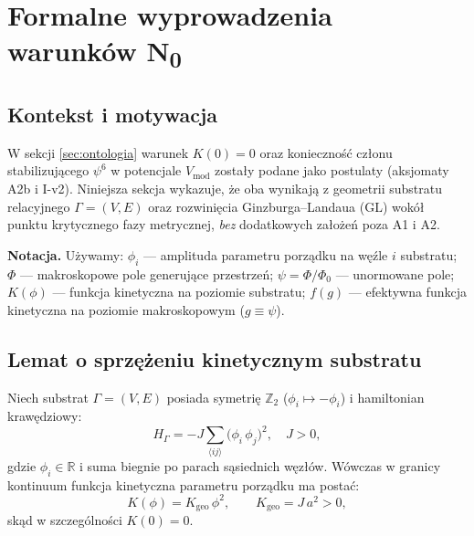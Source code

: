 %
%

\section{Formalne wyprowadzenia warunków N\textsubscript{0}}
\label{sec:N0_derivation}

\subsection{Kontekst i motywacja}

W sekcji \ref{sec:ontologia} warunek $K(0) = 0$ oraz konieczność członu
stabilizującego $\psi^6$ w potencjale $V_\mathrm{mod}$ zostały podane jako
postulaty (aksjomaty A2b i I-v2). Niniejsza sekcja wykazuje, że oba wynikają
z geometrii substratu relacyjnego $\Gamma = (V,E)$ oraz rozwinięcia
Ginzburga–Landaua (GL) wokół punktu krytycznego fazy metrycznej,
\emph{bez} dodatkowych założeń poza A1 i A2.

\medskip
\noindent\textbf{Notacja.} Używamy: $\phi_i$ — amplituda parametru porządku
na węźle $i$ substratu; $\Phi$ — makroskopowe pole generujące przestrzeń;
$\psi = \Phi/\Phi_0$ — unormowane pole; $K(\phi)$ — funkcja kinetyczna
na poziomie substratu; $f(g)$ — efektywna funkcja kinetyczna na poziomie
makroskopowym ($g \equiv \psi$).

\subsection{Lemat o sprzężeniu kinetycznym substratu}
\label{subsec:substrate_coupling}

\begin{lemat}
\label{lem:K_phi2}
Niech substrat $\Gamma = (V,E)$ posiada symetrię $\mathbb{Z}_2$
($\phi_i \mapsto -\phi_i$) i hamiltonian krawędziowy:
\begin{equation}
  H_\Gamma = -J \sum_{\langle i j \rangle} \bigl(\phi_i\,\phi_j\bigr)^2,
  \quad J > 0,
  \label{eq:H_substrate}
\end{equation}
gdzie $\phi_i \in \mathbb{R}$ i suma biegnie po parach sąsiednich węzłów.
Wówczas w granicy kontinuum funkcja kinetyczna parametru porządku ma postać:
\begin{equation}
  K(\phi) = K_\mathrm{geo}\,\phi^2,
  \qquad K_\mathrm{geo} = J\,a^2 > 0,
  \label{eq:K_phi2}
\end{equation}
skąd w szczególności $K(0) = 0$.
\end{lemat}


